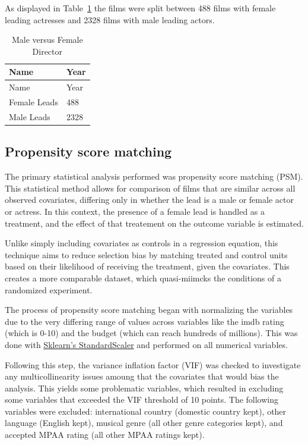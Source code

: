 \documentclass[
]{agujournal2019}
\begin{document}
As displayed in Table~\ref{tbl-2} the films were split between 488 films
with female leading actresses and 2328 films with male leading actors.

\begin{longtable}[]{@{}ll@{}}
\caption{Male versus Female Director}\label{tbl-2}\tabularnewline
\toprule\noalign{}
Name & Year \\
\midrule\noalign{}
\endfirsthead
\toprule\noalign{}
Name & Year \\
\midrule\noalign{}
\endhead
\bottomrule\noalign{}
\endlastfoot
Female Leads & 488 \\
Male Leads & 2328 \\
\end{longtable}

\subsection{Propensity score matching}\label{propensity-score-matching}

The primary statistical analysis performed was propensity score matching
(PSM). This statistical method allows for comparison of films that are
similar across all observed covariates, differing only in whether the
lead is a male or female actor or actress. In this context, the presence
of a female lead is handled as a treatment, and the effect of that
treatement on the outcome variable is estimated.

Unlike simply including covariates as controls in a regression equation,
this technique aims to reduce selection bias by matching treated and
control units based on their likelihood of receiving the treatment,
given the covariates. This creates a more comparable dataset, which
quasi-miimcks the conditions of a randomized experiment.

The process of propensity score matching began with normalizing the
variables due to the very differing range of values across variables
like the imdb rating (which is 0-10) and the budget (which can reach
hundreds of millions). This was done with
\href{https://scikit-learn.org/stable/modules/generated/sklearn.preprocessing.StandardScaler.html}{Sklearn's
StandardScaler} and performed on all numerical variables.

Following this step, the variance inflation factor (VIF) was checked to
investigate any multicollinearity issues amoung that the covariates that
would bias the analysis. This yields some problematic variables, which
resulted in excluding some variables that exceeded the VIF threshold of
10 points. The following variables were excluded: international country
(domestic country kept), other language (English kept), musical genre
(all other genre categories kept), and accepted MPAA rating (all other
MPAA ratings kept).
\end{document}
